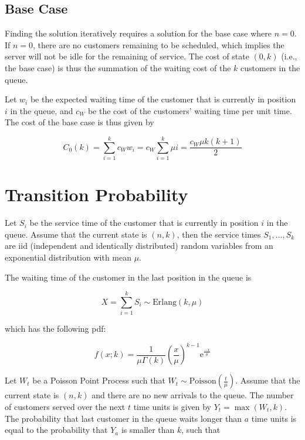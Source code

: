 \subsection{Base Case}

Finding the solution iteratively requires a solution for the base case where $n = 0$. If $n = 0$, there are no customers remaining to be scheduled, which implies the server will not be idle for the remaining of service. The cost of state $(0, k)$ (i.e., the base case) is thus the summation of the waiting cost of the $k$ customers in the queue.

Let $w_{i}$ be the expected waiting time of the customer that is currently in position $i$ in the queue, and $c_{W}$ be the cost of the customers' waiting time per unit time. The cost of the base case is thus given by

\begin{equation}
 	C_{0} (k) = \sum_{i = 1}^{k} c_{W} w_{i} = c_{W} \sum_{i = 1}^{k} \mu i = \frac{c_{W} \mu k (k + 1)}{2}
\end{equation}

\section{Transition Probability}

Let $S_{i}$ be the service time of the customer that is currently in position $i$ in the queue. Assume that the current state is $(n, k)$, then the service times $S_{1}, \ldots, S_{k}$ are iid (independent and identically distributed) random variables from an exponential distribution with mean $\mu$.

The waiting time of the customer in the last position in the queue is

\begin{equation}
	X = \sum_{i = 1}^{k} S_{i} \sim \text{Erlang}(k, \mu)
\end{equation}

which has the following pdf:

\begin{equation}
	f (x; k) = \frac{1}{\mu \Gamma (k)} \left( \frac{x}{\mu} \right)^{k - 1} \mathrm{e}^{\frac{-x}{\mu}}
\end{equation}

Let $W_{t}$ be a Poisson Point Process such that $W_{t} \sim \text{Poisson} \left( \frac{t}{\mu} \right)$. Assume that the current state is $(n, k)$ and there are no new arrivals to the queue. The number of customers served over the next $t$ time units is given by $Y_{t} = \max (W_{t}, k)$. The probability that last customer in the queue waits longer than $a$ time units is equal to the probability that $Y_{a}$ is smaller than $k$, such that

